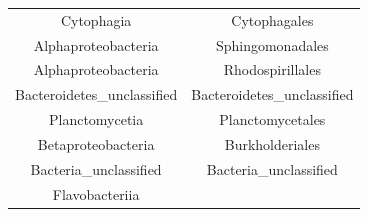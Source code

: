 \documentclass[]{article}
\begin{document}
\begin{longtable}[]{@{}cc@{}}
\begin{minipage}[t]{0.38\columnwidth}
Cytophagia\strut
\end{minipage} & \begin{minipage}[t]{0.38\columnwidth}\centering\strut
Cytophagales\strut
\end{minipage}\tabularnewline
\begin{minipage}[t]{0.38\columnwidth}\centering\strut
Alphaproteobacteria\strut
\end{minipage} & \begin{minipage}[t]{0.38\columnwidth}\centering\strut
Sphingomonadales\strut
\end{minipage}\tabularnewline
\begin{minipage}[t]{0.38\columnwidth}\centering\strut
Alphaproteobacteria\strut
\end{minipage} & \begin{minipage}[t]{0.38\columnwidth}\centering\strut
Rhodospirillales\strut
\end{minipage}\tabularnewline
\begin{minipage}[t]{0.38\columnwidth}\centering\strut
Bacteroidetes\_unclassified\strut
\end{minipage} & \begin{minipage}[t]{0.38\columnwidth}\centering\strut
Bacteroidetes\_unclassified\strut
\end{minipage}\tabularnewline
\begin{minipage}[t]{0.38\columnwidth}\centering\strut
Planctomycetia\strut
\end{minipage} & \begin{minipage}[t]{0.38\columnwidth}\centering\strut
Planctomycetales\strut
\end{minipage}\tabularnewline
\begin{minipage}[t]{0.38\columnwidth}\centering\strut
Betaproteobacteria\strut
\end{minipage} & \begin{minipage}[t]{0.38\columnwidth}\centering\strut
Burkholderiales\strut
\end{minipage}\tabularnewline
\begin{minipage}[t]{0.38\columnwidth}\centering\strut
Bacteria\_unclassified\strut
\end{minipage} & \begin{minipage}[t]{0.38\columnwidth}\centering\strut
Bacteria\_unclassified\strut
\end{minipage}\tabularnewline
\begin{minipage}[t]{0.38\columnwidth}\centering\strut
Flavobacteriia\strut
\end{minipage} & \begin{minipage}[t]{0.38\columnwidth}\centering\strut

\end{minipage}
\end{longtable}
\end{document}
